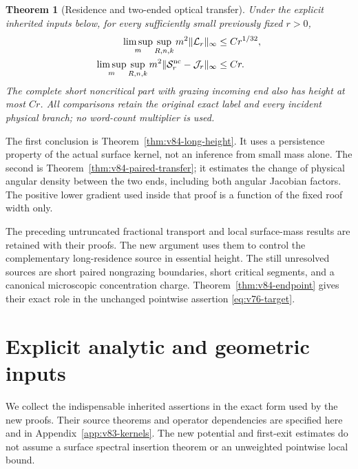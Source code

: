 \documentclass[11pt,reqno]{amsart}
\numberwithin{equation}{section}
\newtheorem{theorem}{Theorem}[section]
\theoremstyle{definition}
\theoremstyle{remark}\newtheorem{remark}[theorem]{Remark}
\begin{document}
\begin{theorem}[Residence and two-ended optical transfer]
\label{thm:v84-main}
Under the explicit inherited inputs below, for every sufficiently
small previously fixed $r>0$,
\begin{align}
 \limsup_m\sup_{R,n,k}m^2\|\mathcal L_r\|_\infty
                          &\le Cr^{1/32},\label{eq:v84-main-long}\\
 \limsup_m\sup_{R,n,k}m^2
       \|\mathcal S_r^{\rm nc}-\mathcal J_r\|_\infty
                          &\le Cr.\label{eq:v84-main-pair}
\end{align}
The complete short noncritical part with grazing incoming end also
has height at most $Cr$. All comparisons retain the original exact
label and every incident physical branch; no word-count multiplier
is used.
\end{theorem}
The first conclusion is Theorem~\ref{thm:v84-long-height}. It uses a
persistence property of the actual surface kernel, not an inference
from small mass alone. The second is
Theorem~\ref{thm:v84-paired-transfer}; it estimates the change of
physical angular density between the two ends, including both angular
Jacobian factors. The positive lower gradient used inside that proof
is a function of the fixed roof width only.

The preceding untruncated fractional transport and local surface-mass
results are retained with their proofs. The new argument uses them to
control the complementary long-residence source in essential height.
The still unresolved sources are short paired nongrazing boundaries,
short critical segments, and a canonical microscopic concentration
charge. Theorem~\ref{thm:v84-endpoint} gives their exact role in the
unchanged pointwise assertion \eqref{eq:v76-target}.

\section{Explicit analytic and geometric inputs}
We collect the indispensable inherited assertions in the exact form
used by the new proofs. Their source theorems and operator dependencies
are specified here and in Appendix~\ref{app:v83-kernels}. The new
potential and first-exit estimates do not assume a surface spectral
insertion theorem or an unweighted pointwise local bound.
\end{document}
